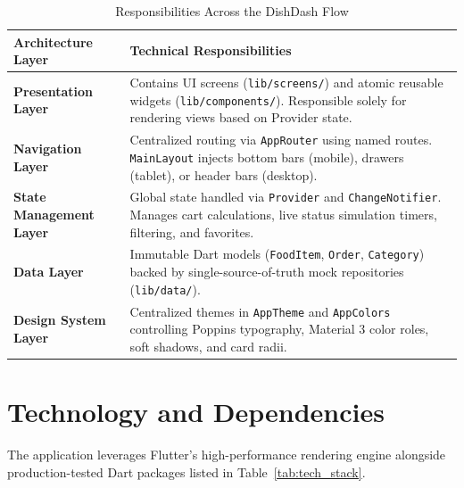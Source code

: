 \documentclass[11pt,a4paper]{article}
\begin{document}
\begin{table}[htbp]
\caption{Responsibilities Across the DishDash Flow}
\label{tab:architecture_components}
\centering
\small
\begin{tabularx}{\linewidth}{@{}l X@{}}
\toprule
\textbf{Architecture Layer} & \textbf{Technical Responsibilities} \\
\midrule
\textbf{Presentation Layer} & Contains UI screens (\texttt{lib/\allowbreak screens/}) and atomic reusable widgets (\texttt{lib/\allowbreak components/}). Responsible solely for rendering views based on Provider state. \\
\addlinespace
\textbf{Navigation Layer} & Centralized routing via \texttt{AppRouter} using named routes. \texttt{MainLayout} injects bottom bars (mobile), drawers (tablet), or header bars (desktop). \\
\addlinespace
\textbf{State Management Layer} & Global state handled via \texttt{Provider} and \texttt{ChangeNotifier}. Manages cart calculations, live status simulation timers, filtering, and favorites. \\
\addlinespace
\textbf{Data Layer} & Immutable Dart models (\texttt{FoodItem}, \texttt{Order}, \texttt{Category}) backed by single-source-of-truth mock repositories (\texttt{lib/\allowbreak data/}). \\
\addlinespace
\textbf{Design System Layer} & Centralized themes in \texttt{AppTheme} and \texttt{AppColors} controlling Poppins typography, Material 3 color roles, soft shadows, and card radii. \\
\bottomrule
\end{tabularx}
\end{table}

\FloatBarrier

\section{Technology and Dependencies}

The application leverages Flutter's high-performance rendering engine alongside production-tested Dart packages listed in Table~\ref{tab:tech_stack}.
\end{document}
